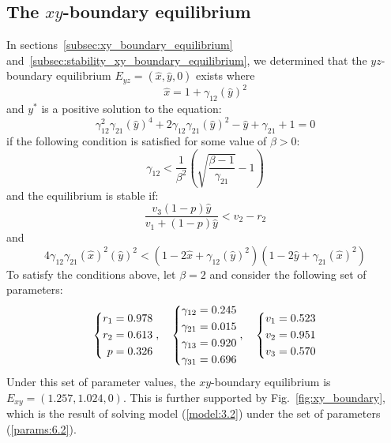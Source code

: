 \subsection{The $xy$-boundary equilibrium}\label{subsec:numsim_xy_boundary_equilibrium}
In sections~\ref{subsec:xy_boundary_equilibrium} and~\ref{subsec:stability_xy_boundary_equilibrium}, we determined that the $yz$-boundary equilibrium $E_{yz}=\left(\hat{x},\hat{y},0\right)$ exists where
\[
\hat{x}=1+\gamma_{12}\left(\hat{y}\right)^2
\]
and $y^*$ is a positive solution to the equation:
\[
\gamma_{12}^2\gamma_{21}\left(\hat{y}\right)^4+2\gamma_{12}\gamma_{21}\left(\hat{y}\right)^2-\hat{y}+\gamma_{21}+1=0
\]
if the following condition is satisfied for some value of $\beta>0$:
\[
\gamma_{12}<\frac1{\beta^2}\left(\sqrt{\frac{\beta-1}{\gamma_{21}}}-1\right)
\]
and the equilibrium is stable if:
\[
\frac{v_3\left(1-p\right)\hat{y}}{v_1+\left(1-p\right)\hat{y}}<v_2-r_2
\]
and
\[
4\gamma_{12}\gamma_{21}\left(\hat{x}\right)^2\left(\hat{y}\right)^2<\left(1-2\hat{x}+\gamma_{12}\left(\hat{y}\right)^2\right)\left(1-2\hat{y}+\gamma_{21}\left(\hat{x}\right)^2\right)
\]
To satisfy the conditions above, let $\beta=2$ and consider the following set of parameters:
\begin{equation}
    \begin{dcases}
        \begin{aligned}
            r_1 &= 0.978\\
            r_2 &= 0.613\\
            p &= 0.326
        \end{aligned}
    \end{dcases},\quad 
    \begin{dcases}
        \begin{aligned}
            \gamma_{12} &= 0.245\\
            \gamma_{21} &= 0.015\\
            \gamma_{13} &= 0.920\\
            \gamma_{31} &= 0.696
        \end{aligned}
    \end{dcases},\quad
    \begin{dcases}
        \begin{aligned}
            v_1 &= 0.523\\
            v_2 &= 0.951\\
            v_3 &= 0.570
        \end{aligned}
    \end{dcases} 
    \label{params:6.2}
\end{equation}
Under this set of parameter values, the $xy$-boundary equilibrium is $E_{xy}=(1.257,1.024,0)$. This is further supported by Fig.~\ref{fig:xy_boundary}, which is the result of solving model (\ref{model:3.2}) under the set of parameters (\ref{params:6.2}).

